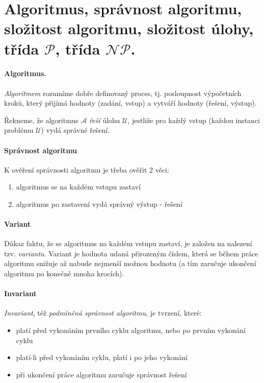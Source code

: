 \section[TAL - Algoritmus, $\mathcal{P}$, $\mathcal{NP}$]{Algoritmus, správnost algoritmu, složitost algoritmu, složitost úlohy, třída $\mathcal{P}$, třída $\mathcal{NP}$.}

\paragraph{Algoritmus.}
\label{algoritmus}
\textit{Algoritmem} rozumíme dobře definovaný proces, tj. posloupnost výpočetních kroků, který přijímá hodnoty (zadání, vstup) a vytváří hodnoty (řešení, výstup).

Řekneme, že algoritmus $\mathcal{A}$ \textit{řeší}  úlohu $\mathcal{U}$, jestliže pro každý vstup (každou instanci problému $\mathcal{U}$) vydá správné řešení.

\paragraph{Správnost algoritmu}
K ověření správnosti algoritmu je třeba ověřit 2 věci:
\begin{enumerate}[itemsep=0pt]
    \item algoritmus se na každém vstupu zastaví
    \item algoritmus po zastavení vydá správný výstup - řešení
\end{enumerate}

\paragraph{Variant}
Důkaz faktu, že se algoritmus na každém vstupu zastaví, je založen na nalezení tzv. \textit{variantu}. Variant je hodnota udaná přirozeným číslem, která se během práce algoritmu snižuje až nabude nejmenší možnou hodnotu (a tím zaručuje ukončení algoritmu po konečně mnoha krocích).

\paragraph{Invariant}
\textit{Invariant}, též \textit{podmíněná správnost algoritmu}, je tvrzení, které:
\begin{itemize}[itemsep=0pt]
    \item platí před vykonáním prvního cyklu algoritmu, nebo po prvním vykonání cyklu
    \item platí-li před vykonáním cyklu, platí i po jeho vykonání
    \item při ukončení práce algoritmu zaručuje správnost řešení
\end{itemize}

